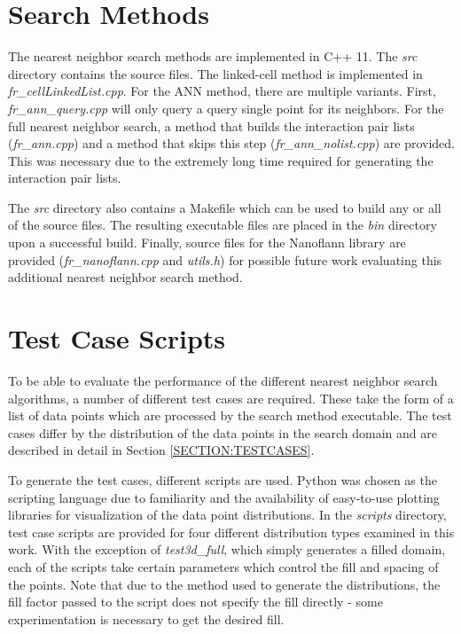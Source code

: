 \section{Search Methods}
\label{SECTION:SRC}

The nearest neighbor search methods are implemented in C++ 11. The {\itshape src} directory contains the source files. The linked-cell method is implemented in {\itshape fr\_cellLinkedList.cpp}. For the ANN method, there are multiple variants. First, {\itshape fr\_ann\_query.cpp} will only query a query single point for its neighbors. For the full nearest neighbor search, a method that builds the interaction pair lists ({\itshape fr\_ann.cpp}) and a method that skips this step ({\itshape fr\_ann\_nolist.cpp}) are provided. This was necessary due to the extremely long time required for generating the interaction pair lists.

The {\itshape src} directory also contains a Makefile which can be used to build any or all of the source files. The resulting executable files are placed in the {\itshape bin} directory upon a successful build. Finally, source files for the Nanoflann library are provided ({\itshape fr\_nanoflann.cpp} and {\itshape utils.h}) for possible future work evaluating this additional  nearest neighbor search method.

\section{Test Case Scripts}
\label{SECTION:TESTCASESCRIPTS}

To be able to evaluate the performance of the different nearest neighbor search algorithms, a number of different test cases are required. These take the form of a list of data points which are processed by the search method executable. The test cases differ by the distribution of the data points in the search domain and are described in detail in Section \ref{SECTION:TESTCASES}.

To generate the test cases, different scripts are used. Python was chosen as the scripting language due to familiarity and the availability of easy-to-use plotting libraries for visualization of the data point distributions. In the {\itshape scripts} directory, test case scripts are provided for four different distribution types examined in this work. With the exception of {\itshape test3d\_full}, which simply generates a filled domain, each of the scripts take certain parameters which control the fill and spacing of the points.  Note that due to the method used to generate the distributions, the fill factor passed to the script does not specify the fill directly - some experimentation is necessary to get the desired fill. 

